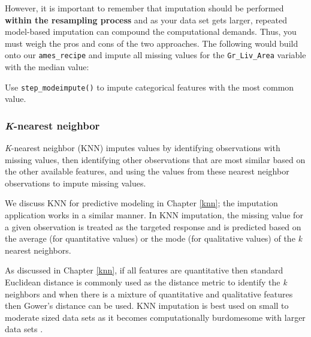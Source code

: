 \documentclass[]{krantz}
\makeatletter
\newenvironment{Shaded}{\begin{snugshade}}{\end{snugshade}}
\newcommand{\CommentTok}[1]{\textcolor[rgb]{0.37,0.37,0.37}{\textit{#1}}}
\newcommand{\KeywordTok}[1]{\textcolor[rgb]{0.27,0.27,0.27}{\textbf{#1}}}
\newcommand{\NormalTok}[1]{#1}
\newcommand{\OperatorTok}[1]{\textcolor[rgb]{0.43,0.43,0.43}{\textbf{#1}}}
\newcommand{\StringTok}[1]{\textcolor[rgb]{0.5,0.5,0.5}{#1}}
\newenvironment{kframe}{%
\medskip{}
\setlength{\fboxsep}{.8em}
 \def\at@end@of@kframe{}%
 \ifinner\ifhmode%
  \def\at@end@of@kframe{\end{minipage}}%
  \begin{minipage}{\columnwidth}%
 \fi\fi%
 \def\FrameCommand##1{\hskip\@totalleftmargin \hskip-\fboxsep
 \colorbox{shadecolor}{##1}\hskip-\fboxsep
     \hskip-\linewidth \hskip-\@totalleftmargin \hskip\columnwidth}%
 \MakeFramed {\advance\hsize-\width
   \@totalleftmargin\z@ \linewidth\hsize
   \@setminipage}}%
 {\par\unskip\endMakeFramed%
 \at@end@of@kframe}
\newenvironment{block}[1]
  {
  \begin{itemize}
  \renewcommand{\labelitemi}{
    \raisebox{-.7\height}[0pt][0pt]{
      {\setkeys{Gin}{width=3em,keepaspectratio}\texttt{[image: icons/\#1]}}
    }
  }
  \setlength{\fboxsep}{1em}
  \begin{kframe}
  \item
  }
  {
  \end{kframe}
  \end{itemize}
  }
\newenvironment{tip}
  {\begin{block}{tip}}
  {\end{block}}
\renewenvironment{Shaded}{\begin{kframe}}{\end{kframe}}
\makeatother
\begin{document}
However, it is important to remember that imputation should be performed \textbf{within the resampling process} and as your data set gets larger, repeated model-based imputation can compound the computational demands. Thus, you must weigh the pros and cons of the two approaches. The following would build onto our \texttt{ames\_recipe} and impute all missing values for the \texttt{Gr\_Liv\_Area} variable with the median value:

\begin{Shaded}
\end{Shaded}

\begin{tip}
Use \texttt{step\_modeimpute()} to impute categorical features with the
most common value.
\end{tip}

\hypertarget{k-nearest-neighbor}{%
\subsubsection{\texorpdfstring{\emph{K}-nearest neighbor}{K-nearest neighbor}}\label{k-nearest-neighbor}}

\emph{K}-nearest neighbor (KNN) imputes values by identifying observations with missing values, then identifying other observations that are most similar based on the other available features, and using the values from these nearest neighbor observations to impute missing values.

We discuss KNN for predictive modeling in Chapter \ref{knn}; the imputation application works in a similar manner. In KNN imputation, the missing value for a given observation is treated as the targeted response and is predicted based on the average (for quantitative values) or the mode (for qualitative values) of the \emph{k} nearest neighbors.

As discussed in Chapter \ref{knn}, if all features are quantitative then standard Euclidean distance is commonly used as the distance metric to identify the \emph{k} neighbors and when there is a mixture of quantitative and qualitative features then Gower's distance \citep{gower1971general} can be used. KNN imputation is best used on small to moderate sized data sets as it becomes computationally burdomesome with larger data sets \citep{kuhn2019feature}.
\end{document}
